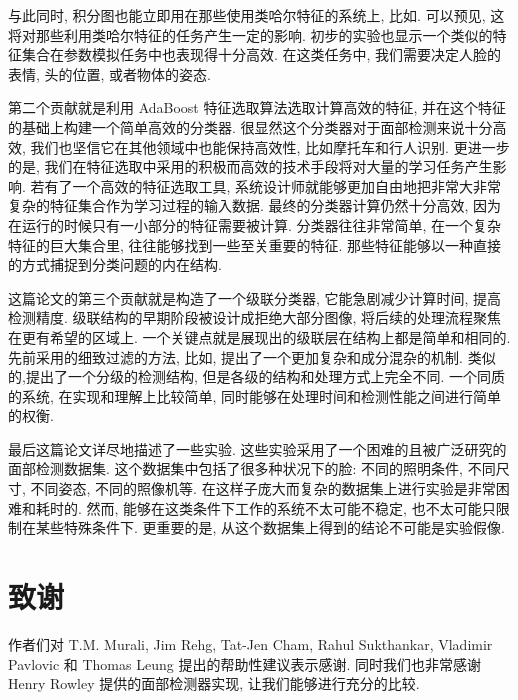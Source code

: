 \documentclass[a4paper,utf8,11pt]{ctexart}
\begin{document}
与此同时, 积分图也能立即用在那些使用类哈尔特征的系统上, 比如\citet{papageorgiou1998general}. 可以预见, 这将对那些利用类哈尔特征的任务产生一定的影响. 初步的实验也显示一个类似的特征集合在参数模拟任务中也表现得十分高效. 在这类任务中, 我们需要决定人脸的表情, 头的位置, 或者物体的姿态.

第二个贡献就是利用 AdaBoost 特征选取算法选取计算高效的特征, 并在这个特征的基础上构建一个简单高效的分类器. 很显然这个分类器对于面部检测来说十分高效, 我们也坚信它在其他领域中也能保持高效性, 比如摩托车和行人识别. 更进一步的是, 我们在特征选取中采用的积极而高效的技术手段将对大量的学习任务产生影响. 若有了一个高效的特征选取工具, 系统设计师就能够更加自由地把非常大非常复杂的特征集合作为学习过程的输入数据.
最终的分类器计算仍然十分高效, 因为在运行的时候只有一小部分的特征需要被计算. 分类器往往非常简单, 在一个复杂特征的巨大集合里, 往往能够找到一些至关重要的特征. 那些特征能够以一种直接的方式捕捉到分类问题的内在结构.

这篇论文的第三个贡献就是构造了一个级联分类器, 它能急剧减少计算时间, 提高检测精度. 级联结构的早期阶段被设计成拒绝大部分图像, 将后续的处理流程聚焦在更有希望的区域上. 一个关键点就是展现出的级联层在结构上都是简单和相同的.
先前采用的细致过滤的方法, 比如\citet{itti1998model}, 提出了一个更加复杂和成分混杂的机制. 类似的,\citet{amit1999computational}提出了一个分级的检测结构, 但是各级的结构和处理方式上完全不同. 一个同质的系统, 在实现和理解上比较简单, 同时能够在处理时间和检测性能之间进行简单的权衡.

最后这篇论文详尽地描述了一些实验. 这些实验采用了一个困难的且被广泛研究的面部检测数据集. 这个数据集中包括了很多种状况下的脸: 不同的照明条件, 不同尺寸, 不同姿态, 不同的照像机等. 在这样子庞大而复杂的数据集上进行实验是非常困难和耗时的. 然而, 能够在这类条件下工作的系统不太可能不稳定, 也不太可能只限制在某些特殊条件下. 更重要的是, 从这个数据集上得到的结论不可能是实验假像.
\section{致谢}
作者们对 T.M. Murali, Jim Rehg, Tat-Jen Cham, Rahul Sukthankar, Vladimir Pavlovic 和 Thomas Leung 提出的帮助性建议表示感谢. 同时我们也非常感谢 Henry Rowley 提供的面部检测器实现, 让我们能够进行充分的比较.

\end{document}
